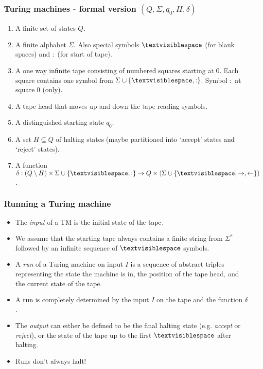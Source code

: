 \documentclass[handout]{beamer}
\newcommand{\tvs}{\textvisiblespace}
\begin{document}
\begin{frame}
\frametitle{Turing machines - formal version $(Q,\Sigma,q_0,H,\delta)$}
\begin{enumerate}
\item A finite set of states $Q$.
\item A finite alphabet $\Sigma$. Also special symbols $\tvs$ (for blank spaces) and $:$ (for start of tape). 
\item A one way infinite tape consisting of numbered squares starting at $0$. Each square contains one symbol from $\Sigma\cup\{\tvs,:\}$. Symbol $:$ at square $0$ (only).
\item A tape head that moves up and down the tape reading symbols. 
\item A distinguished starting state $q_0$.
\item A set $H\subseteq Q$ of halting states (maybe partitioned into `accept' states and `reject' states).
\item A function $\delta: (Q\setminus H)\times\Sigma\cup\{\tvs,:\} \to Q \times (\Sigma\cup\{\tvs,\rightarrow,\leftarrow\})$.
\end{enumerate}
\end{frame}

\begin{frame}
\frametitle{Running a Turing machine}
\begin{itemize}
\item The \emph{input} of a TM is the initial state of the tape. 
\item We assume that the starting tape always contains a finite string from $\Sigma^*$ followed by an infinite sequence of $\tvs$ symbols.
\item A \emph{run} of a Turing machine on input $I$ is a sequence of abstract triples representing the state the machine is in, the position of the tape head, and the current state of the tape. 
\item A run is completely determined by the input $I$ on the tape and the function $\delta$. 
\item The \emph{output} can either be defined to be the final halting state (e.g. \emph{accept} or \emph{reject}), or the state of the tape up to the first $\tvs$ after halting.
\item Runs don't always halt!
\end{itemize}
\end{frame}
\end{document}
